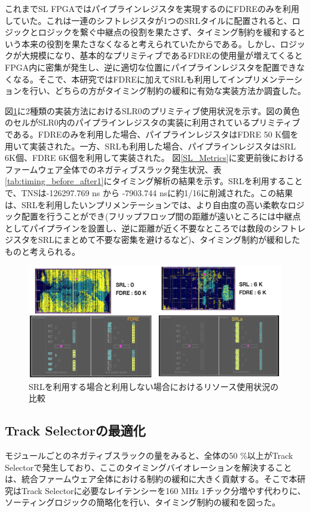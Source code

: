 これまでSL FPGAではパイプラインレジスタを実現するのにFDREのみを利用していた。これは一連のシフトレジスタが1つのSRLタイルに配置されると、ロジックとロジックを繋ぐ中継点の役割を果たさず、タイミング制約を緩和するという本来の役割を果たさなくなると考えられていたからである。しかし、ロジックが大規模になり、基本的なプリミティブであるFDREの使用量が増えてくるとFPGA内に密集が発生し、逆に適切な位置にパイプラインレジスタを配置できなくなる。そこで、本研究ではFDREに加えてSRLも利用してインプリメンテーションを行い、どちらの方がタイミング制約の緩和に有効な実装方法か調査した。

図\ref{SRL_FDRE}に2種類の実装方法におけるSLR0のプリミティブ使用状況を示す。図の黄色のセルがSLR0内のパイプラインレジスタの実装に利用されているプリミティブである。FDREのみを利用した場合、パイプラインレジスタはFDRE 50 K個を用いて実装された。一方、SRLも利用した場合、パイプラインレジスタはSRL 6K個、FDRE 6K個を利用して実装された。
図\ref{SL_Metrics}に変更前後におけるファームウェア全体でのネガティブスラック発生状況、表\ref{tab:timing_before_after1}にタイミング解析の結果を示す。SRLを利用することで、TNSは-126297.769 ns から -7903.744 nsに約1/16に削減された。この結果は、SRLを利用したいンプリメンテーションでは、より自由度の高い柔軟なロジック配置を行うことができ(フリップフロップ間の距離が遠いところには中継点としてパイプラインを設置し、逆に距離が近く不要なところでは数段のシフトレジスタをSRLにまとめて不要な密集を避けるなど)、タイミング制約が緩和したものと考えられる。

\begin{figure} 
\centering
\includegraphics[width=16cm]{fig/SL/SRL_FERE.png}
\caption[SRLを利用する場合と利用しない場合におけるリソース使用状況の比較]{SRLを利用する場合と利用しない場合におけるリソース使用状況の比較}
\label{SRL_FDRE}
\end{figure}


\subsection{Track Selectorの最適化}
モジュールごとのネガティブスラックの量をみると、全体の50 \%以上がTrack Selectorで発生しており、ここのタイミングバイオレーションを解決することは、統合ファームウェア全体における制約の緩和に大きく貢献する。そこで本研究はTrack Selectorに必要なレイテンシーを160 MHz 1チック分増やす代わりに、ソーティングロジックの簡略化を行い、タイミング制約の緩和を図った。

